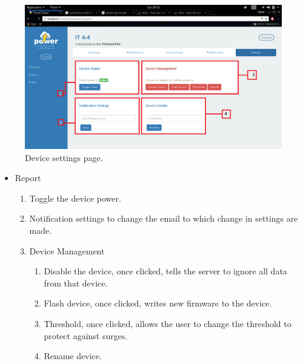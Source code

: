 \documentclass[a4paper,10pt]{article}
\begin{document}
		\begin{figure}[H]
			\includegraphics[width=\textwidth]{images/Device_Settings.png}
			\caption{Device settings page. \label{overflow}}
		\end{figure}		
		\begin{itemize}
			\item Report
			\begin{enumerate}
				\item Toggle the device power.
				\item Notification settings to change the email to which change in settings are made.
				\item Device Management
				\begin{enumerate}
					\item Disable the device, once clicked, tells the server to ignore all data from that device.
					\item Flash device, once clicked, writes new firmware to the device.
					\item Threshold, once clicked, allows the user to change the threshold to protect against surges.
					\item Rename device.
				\end{enumerate}
			\end{enumerate}
		\end{itemize}
		
\end{document}
